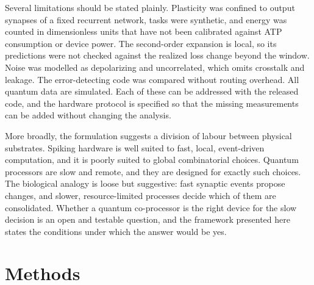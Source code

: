 \documentclass[12pt,a4paper]{article}
\begin{document}
Several limitations should be stated plainly. Plasticity was confined to output synapses of a fixed recurrent network, tasks were synthetic, and energy was counted in dimensionless units that have not been calibrated against ATP consumption or device power. The second-order expansion is local, so its predictions were not checked against the realized loss change beyond the window. Noise was modelled as depolarizing and uncorrelated, which omits crosstalk and leakage. The error-detecting code was compared without routing overhead. All quantum data are simulated. Each of these can be addressed with the released code, and the hardware protocol is specified so that the missing measurements can be added without changing the analysis.

More broadly, the formulation suggests a division of labour between physical substrates. Spiking hardware is well suited to fast, local, event-driven computation, and it is poorly suited to global combinatorial choices. Quantum processors are slow and remote, and they are designed for exactly such choices. The biological analogy is loose but suggestive: fast synaptic events propose changes, and slower, resource-limited processes decide which of them are consolidated\cite{frey1997}. Whether a quantum co-processor is the right device for the slow decision is an open and testable question, and the framework presented here states the conditions under which the answer would be yes.

\section*{Methods}
\end{document}

